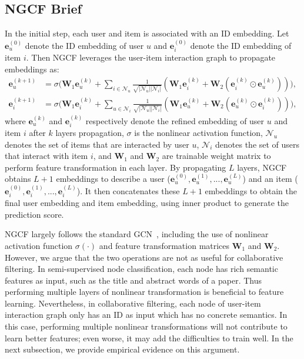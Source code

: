 \documentclass[sigconf]{acmart}
\newcommand{\Mat}[1]{\mathbf{#1}}
\newcommand{\Set}[1]{\mathcal{#1}}
\theoremstyle{definition}
\begin{document}
\subsection{NGCF Brief}\label{ss:ngcf}
In the initial step, each user and item is associated with an ID embedding. Let $\textbf{e}_u^{(0)}$ denote the ID embedding of user $u$ and $\textbf{e}_i^{(0)}$ denote the ID embedding of item $i$. Then NGCF leverages the user-item interaction graph to propagate embeddings as:
\begin{equation}\label{eq:NGCF}
\begin{aligned}
    \textbf{e}_{u}^{(k+1)} &= \sigma \Big(\textbf{W}_1 \textbf{e}_u^{(k)} + \sum_{i\in \mathcal{N}_u} \frac{1}{\sqrt{|\Set{N}_{u}||\Set{N}_{i}|}}(\Mat{W}_{1}\Mat{e}_{i}^{(k)} + \Mat{W}_{2}(\Mat{e}_{i}^{(k)}\odot\Mat{e}_{u}^{(k)}))\Big), \\
    \textbf{e}_{i}^{(k+1)} &= \sigma \Big(\textbf{W}_1 \textbf{e}_i^{(k)} + \sum_{u\in \mathcal{N}_i} \frac{1}{\sqrt{|\Set{N}_{u}||\Set{N}_{i}|}}(\Mat{W}_{1}\Mat{e}_{u}^{(k)} + \Mat{W}_{2}(\Mat{e}_{u}^{(k)}\odot\Mat{e}_{i}^{(k)}))\Big),
\end{aligned}
\end{equation}
where $\textbf{e}_{u}^{(k)}$ and $\textbf{e}_{i}^{(k)}$ respectively denote the refined embedding of user $u$ and item $i$ after $k$ layers propagation, $\sigma$ is the nonlinear activation function,
$\Set{N}_{u}$ denotes the set of items that are interacted by user $u$, $\Set{N}_{i}$ denotes the set of users that interact with item $i$, and $\textbf{W}_1$ and $\textbf{W}_2$ are trainable weight matrix to perform feature transformation in each layer. 
By propagating $L$ layers, NGCF obtains
$L+1$ embeddings to describe a user ($\textbf{e}_u^{(0)}, \textbf{e}_u^{(1)}, ..., \textbf{e}_u^{(L)}$) and an item ($\textbf{e}_i^{(0)}, \textbf{e}_i^{(1)}, ..., \textbf{e}_i^{(L)}$). It then concatenates these $L+1$ embeddings to obtain the final user embedding and item embedding, using inner product to generate the prediction score. 


NGCF largely follows the standard GCN~\cite{GCN}, including the use of nonlinear activation function $\sigma(\cdot)$ and feature transformation matrices $\textbf{W}_1$ and $\textbf{W}_2$. However, we argue that the two operations are not as useful for collaborative filtering. In  semi-supervised node classification, each node has rich semantic features as input, such as the title and abstract words of a paper. Thus performing multiple layers of nonlinear transformation is beneficial to feature learning. Nevertheless, in collaborative filtering, each node of user-item interaction graph only has an ID as input which has no concrete semantics. In this case, performing multiple nonlinear transformations will not contribute to learn better features; even worse, it may add the difficulties to train well. In the next subsection, we provide empirical evidence on this argument. 
\end{document}
